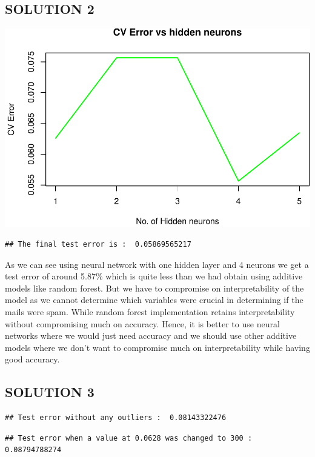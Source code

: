 \documentclass[]{article}
\begin{document}
\subsection{SOLUTION 2}\label{solution-2}

\includegraphics{HW5_Solution_files/figure-latex/unnamed-chunk-2-1.pdf}

\begin{verbatim}
## The final test error is :  0.05869565217
\end{verbatim}

As we can see using neural network with one hidden layer and 4 neurons
we get a test error of around 5.87\% which is quite less than we had
obtain using additive models like random forest. But we have to
compromise on interpretability of the model as we cannot determine which
variables were crucial in determining if the mails were spam. While
random forest implementation retains interpretability without
compromising much on accuracy. Hence, it is better to use neural
networks where we would just need accuracy and we should use other
additive models where we don't want to compromise much on
interpretability while having good accuracy.

\subsection{SOLUTION 3}\label{solution-3}

\begin{verbatim}
## Test error without any outliers :  0.08143322476
\end{verbatim}

\begin{verbatim}
## Test error when a value at 0.0628 was changed to 300 :  0.08794788274
\end{verbatim}
\end{document}
